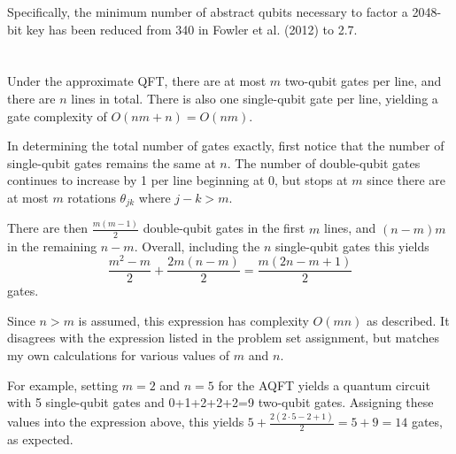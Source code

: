 \documentclass{article}
\begin{document}
Specifically, the minimum number of abstract qubits necessary to factor a 2048-bit key has been reduced from 340 in Fowler et al. (2012) to 2.7.

\section{}

Under the approximate QFT, there are at most $m$ two-qubit gates per line, and there are $n$ lines in total. There is also one single-qubit gate per line, yielding a gate complexity of $O(nm+n)=O(nm)$.

In determining the total number of gates exactly, first notice that the number of single-qubit gates remains the same at $n$. The number of double-qubit gates continues to increase by 1 per line beginning at 0, but stops at $m$ since there are at most $m$ rotations $\theta_{jk}$ where $j-k>m$.

There are then $\frac{m(m-1)}{2}$ double-qubit gates in the first $m$ lines, and $(n-m)m$ in the remaining $n-m$. Overall, including the $n$ single-qubit gates this yields
$$
\frac{m^2-m}{2}+\frac{2m(n-m)}{2}=\boxed{\frac{m(2n-m+1)}{2}}
$$
gates.

Since $n>m$ is assumed, this expression has complexity $O(mn)$ as described. It disagrees with the expression listed in the problem set assignment, but matches my own calculations for various values of $m$ and $n$.

For example, setting $m=2$ and $n=5$ for the AQFT yields a quantum circuit with 5 single-qubit gates and 0+1+2+2+2=9 two-qubit gates. Assigning these values into the expression above, this yields $5+\frac{2(2\cdot 5-2+1)}{2}=5+9=14$ gates, as expected.
\end{document}
